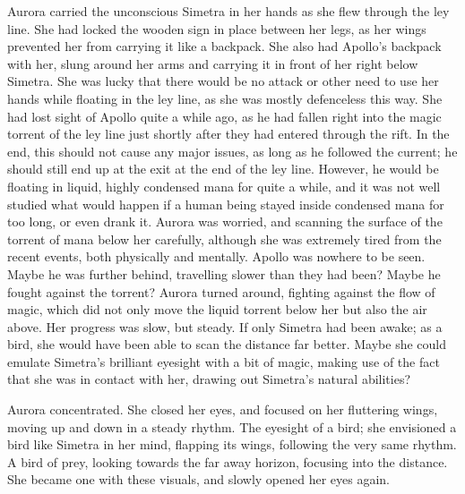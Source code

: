 \fancybreaker{}

Aurora carried the unconscious Simetra in her hands as she flew through the ley line. She had locked the wooden sign in place between her legs, as her wings prevented her from carrying it like a backpack. She also had Apollo's backpack with her, slung around her arms and carrying it in front of her right below Simetra. She was lucky that there would be no attack or other need to use her hands while floating in the ley line, as she was mostly defenceless this way. She had lost sight of Apollo quite a while ago, as he had fallen right into the magic torrent of the ley line just shortly after they had entered through the rift. In the end, this should not cause any major issues, as long as he followed the current; he should still end up at the exit at the end of the ley line. However, he would be floating in liquid, highly condensed mana for quite a while, and it was not well studied what would happen if a human being stayed inside condensed mana for too long, or even drank it. Aurora was worried, and scanning the surface of the torrent of mana below her carefully, although she was extremely tired from the recent events, both physically and mentally. Apollo was nowhere to be seen. Maybe he was further behind, travelling slower than they had been? Maybe he fought against the torrent? Aurora turned around, fighting against the flow of magic, which did not only move the liquid torrent below her but also the air above. Her progress was slow, but steady. If only Simetra had been awake; as a bird, she would have been able to scan the distance far better. Maybe she could emulate Simetra's brilliant eyesight with a bit of magic, making use of the fact that she was in contact with her, drawing out Simetra's natural abilities? 

Aurora concentrated. She closed her eyes, and focused on her fluttering wings, moving up and down in a steady rhythm. The eyesight of a bird; she envisioned a bird like Simetra in her mind, flapping its wings, following the very same rhythm. A bird of prey, looking towards the far away horizon, focusing into the distance. She became one with these visuals, and slowly opened her eyes again.


